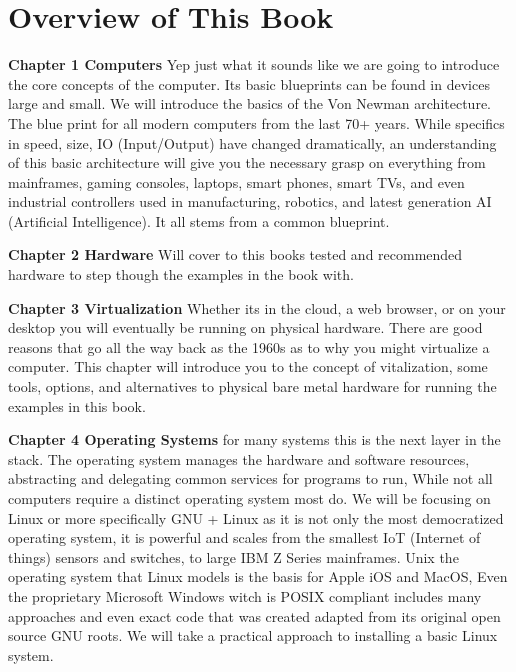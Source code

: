 \section{Overview of This Book}

\begin{flushleft}
\textbf{Chapter 1 Computers} Yep just what it sounds like we are going to introduce the core concepts of the computer. Its basic blueprints can be found in devices large and small. We will introduce the basics of the Von Newman architecture. The blue print for all modern computers from the last 70+ years. While specifics in speed, size, IO (Input/Output) have changed dramatically, an understanding of this basic architecture will give you the necessary grasp on everything from mainframes, gaming consoles, laptops, smart phones, smart TVs, and even industrial controllers used in manufacturing, robotics, and latest generation AI (Artificial Intelligence). It all stems from a common blueprint.\newline

\textbf{Chapter 2 Hardware} Will cover to this books tested and recommended hardware to step though the examples in the book with. \newline

\textbf{Chapter 3 Virtualization} Whether its in the cloud, a web browser, or on your desktop you will eventually be running on physical hardware. There are good reasons that go all the way back as the 1960s as to why you might virtualize a computer. This chapter will introduce you to the concept of vitalization, some tools, options, and alternatives to physical bare metal hardware for running the examples in this book. \newline

\textbf{Chapter 4 Operating Systems} for many systems this is the next layer in the stack. The operating system manages the hardware and software resources, abstracting and delegating common services for programs to run, While not all computers require a distinct operating system most do. We will be focusing on Linux or more specifically GNU + Linux as it is not only the most democratized operating system, it is powerful and scales from the smallest IoT (Internet of things) sensors and switches, to large IBM Z Series mainframes. Unix the operating system that Linux models is the basis for Apple iOS and MacOS, Even the proprietary Microsoft Windows witch is POSIX compliant includes many approaches and even exact code that was created adapted from its original open source GNU roots. We will take a practical approach to installing a basic Linux system. \newline


\end{flushleft}
